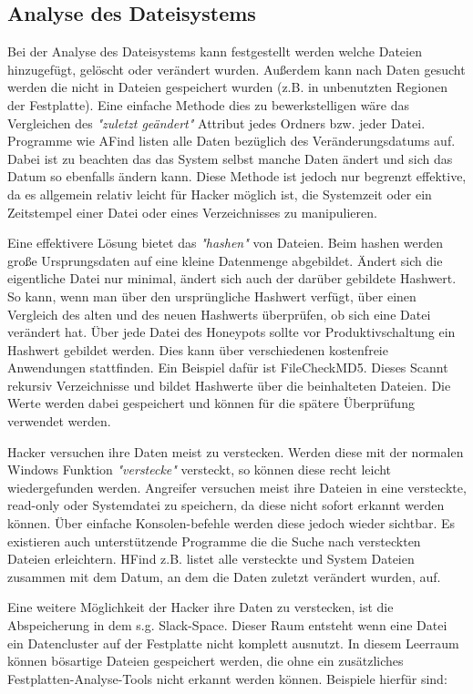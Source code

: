 \subsection{Analyse des Dateisystems}
Bei der Analyse des Dateisystems kann festgestellt werden welche Dateien hinzugefügt, gelöscht oder verändert wurden. Außerdem kann nach Daten gesucht werden die nicht in Dateien gespeichert wurden (z.B. in unbenutzten Regionen der Festplatte). Eine einfache Methode dies zu bewerkstelligen wäre das Vergleichen des \emph{"zuletzt geändert"} Attribut jedes Ordners bzw. jeder Datei. Programme wie AFind listen alle Daten bezüglich des Veränderungsdatums auf. Dabei ist zu beachten das das System selbst manche Daten ändert und sich das Datum so ebenfalls ändern kann. Diese Methode ist jedoch nur begrenzt effektive, da es allgemein relativ leicht für Hacker möglich ist, die Systemzeit oder ein Zeitstempel einer Datei oder eines Verzeichnisses zu manipulieren. 

Eine effektivere Lösung bietet das \emph{"hashen"} von Dateien. Beim hashen werden große Ursprungsdaten auf eine kleine Datenmenge abgebildet. Ändert sich die eigentliche Datei nur minimal, ändert sich auch der darüber gebildete Hashwert. So kann, wenn man über den ursprüngliche Hashwert verfügt, über einen Vergleich des alten und des neuen Hashwerts überprüfen, ob sich eine Datei verändert hat. 
Über jede Datei des Honeypots sollte vor Produktivschaltung ein Hashwert gebildet werden. Dies kann über verschiedenen kostenfreie Anwendungen stattfinden. Ein Beispiel dafür ist FileCheckMD5. Dieses Scannt rekursiv Verzeichnisse und bildet Hashwerte über die beinhalteten Dateien. Die Werte werden dabei gespeichert und können für die spätere Überprüfung verwendet werden.

Hacker versuchen ihre Daten meist zu verstecken. Werden diese mit der normalen Windows Funktion \emph{"verstecke"} versteckt, so können diese recht leicht wiedergefunden werden. Angreifer versuchen meist ihre Dateien in eine versteckte, read-only oder Systemdatei zu speichern, da diese nicht sofort erkannt werden können. Über einfache Konsolen-befehle werden diese jedoch wieder sichtbar. Es existieren auch unterstützende Programme die die Suche nach versteckten Dateien erleichtern. HFind z.B. listet alle versteckte und System Dateien zusammen mit dem Datum, an dem die Daten zuletzt verändert wurden, auf.

Eine weitere Möglichkeit der Hacker ihre Daten zu verstecken, ist die Abspeicherung in dem s.g. Slack-Space. Dieser Raum entsteht wenn eine Datei ein Datencluster auf der Festplatte nicht komplett ausnutzt. In diesem Leerraum können bösartige Dateien gespeichert werden, die ohne ein zusätzliches Festplatten-Analyse-Tools nicht erkannt werden können. Beispiele hierfür sind:

